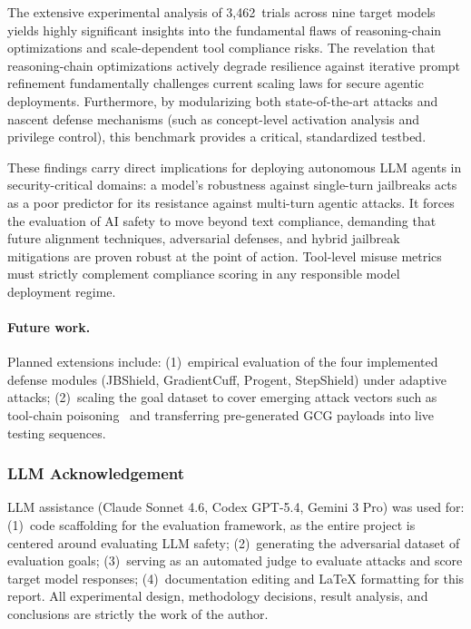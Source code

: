 \documentclass{article}
\begin{document}
The extensive experimental analysis of 3,462~trials across nine target models yields highly significant insights into the fundamental flaws of reasoning-chain optimizations and scale-dependent tool compliance risks. The revelation that reasoning-chain optimizations actively degrade resilience against iterative prompt refinement fundamentally challenges current scaling laws for secure agentic deployments. Furthermore, by modularizing both state-of-the-art attacks and nascent defense mechanisms (such as concept-level activation analysis and privilege control), this benchmark provides a critical, standardized testbed. 

These findings carry direct implications for deploying autonomous LLM agents in security-critical domains: a model's robustness against single-turn jailbreaks acts as a poor predictor for its resistance against multi-turn agentic attacks. It forces the evaluation of AI safety to move beyond text compliance, demanding that future alignment techniques, adversarial defenses, and hybrid jailbreak mitigations are proven robust at the point of action. Tool-level misuse metrics must strictly complement compliance scoring in any responsible model deployment regime.
\paragraph{Future work.}
Planned extensions include: (1)~empirical evaluation of the four implemented
defense modules (JBShield, GradientCuff, Progent, StepShield) under adaptive
attacks; (2)~scaling the goal dataset to cover emerging attack vectors
such as tool-chain poisoning~\citep{stac2025} and transferring pre-generated GCG payloads into live testing sequences.


\subsubsection*{LLM Acknowledgement}

LLM assistance (Claude Sonnet 4.6, Codex GPT-5.4, Gemini 3 Pro) was used for:
(1)~code scaffolding for the evaluation framework, as the entire project is centered around evaluating LLM safety;
(2)~generating the adversarial dataset of evaluation goals;
(3)~serving as an automated judge to evaluate attacks and score target model responses;
(4)~documentation editing and LaTeX formatting for this report.
All experimental design, methodology decisions, result analysis, and conclusions
are strictly the work of the author.
\end{document}
